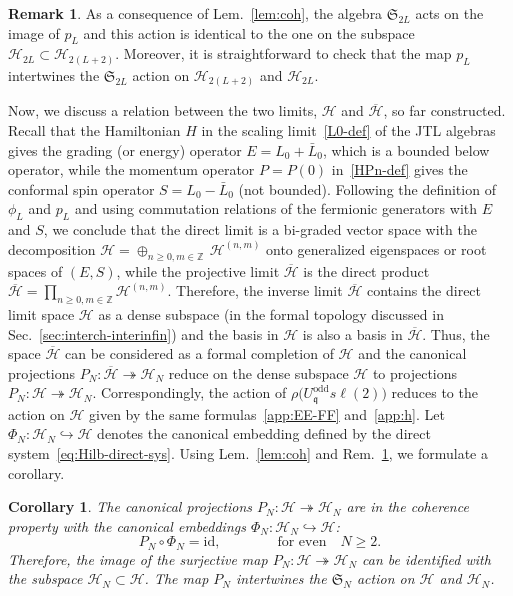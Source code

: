 \documentclass[11pt]{article}
\newcommand{\surj}{\twoheadrightarrow}
\newcommand{\inj}{\hookrightarrow}
\newcommand{\proj}{P}
\newcommand{\q}{\mathfrak{q}}
\newcommand{\LQGodd}{U^{\text{odd}}_{\q} s\ell(2)}
\newcommand{\Hilb}{\mathcal{H}}
\newcommand{\cHilb}{\overline{\Hilb}}
\newcommand{\oZ}{\mathbb{Z}}
\newcommand{\interLie}{\mathfrak{S}}
\newcommand{\interfin}[1]{\interLie_{#1}}
\newtheorem{Cor}[subsection]{Corollary}%
\theoremstyle{definition}
\newtheorem{rem}[subsubsection]{Remark}
\begin{document}
\begin{rem}\label{rem:coh}
As a consequence of Lem.~\ref{lem:coh}, the algebra $\interfin{2L}$ acts on the image of $p_L$ and this action is identical to the one on the subspace $\Hilb_{2L}\subset\Hilb_{2(L+2)}$.  Moreover, it is straightforward to check that the map $p_L$ intertwines the $\interfin{2L}$ action on  $\Hilb_{2(L+2)}$ and $\Hilb_{2L}$. %
\end{rem}

Now, we discuss a relation between the two limits, $\Hilb$ and $\cHilb$, so far constructed.
Recall that the Hamiltonian $H$ in the scaling limit~\eqref{L0-def} of the JTL algebras gives the grading (or energy) operator $E=L_0+\bar{L}_0$, which is a bounded below operator, while the momentum operator $P=P(0)$ in~\eqref{HPn-def} gives the conformal spin operator $S=L_0-\bar{L}_0$ (not bounded).
Following the definition of $\phi_L$ and $p_L$ and using commutation relations of the fermionic generators with $E$ and $S$, we conclude that the direct limit is a bi-graded vector space with the decomposition $\Hilb=\oplus_{n\geq0, m\in\oZ}\, \Hilb^{(n,m)}$ onto generalized eigenspaces or root spaces of $(E,S)$, while the projective limit $\cHilb$ is the direct product $\cHilb=\prod_{n\geq0, m\in\oZ} \Hilb^{(n,m)}$.
Therefore, the inverse limit $\cHilb$ contains the direct limit space $\Hilb$ as a dense subspace (in the formal topology discussed in Sec.~\ref{sec:interch-interinfin}) and the basis in $\Hilb$ is also a basis in $\cHilb$.
Thus, the space $\cHilb$ can be considered as a formal completion of $\Hilb$ and the canonical projections $\proj_N:\cHilb\twoheadrightarrow\Hilb_N$ reduce on the dense subspace $\Hilb$ to projections $\proj_N:\Hilb\twoheadrightarrow\Hilb_N$. Correspondingly, the action of $\rho\bigl(\LQGodd\bigr)$ reduces to the action on $\Hilb$ given by the same formulas~\eqref{app:EE-FF} and~\eqref{app:h}. Let $\Phi_N:\Hilb_{N}\inj\Hilb$ denotes the canonical embedding defined by the direct system~\eqref{eq:Hilb-direct-sys}. Using Lem.~\ref{lem:coh} and Rem.~\ref{rem:coh}, we formulate a corollary.
\begin{Cor}\label{cor:coh}
The canonical projections $\proj_N:\Hilb\surj\Hilb_N$ are in the coherence property with the canonical embeddings  $\Phi_N:\Hilb_{N}\inj\Hilb$:
\begin{equation}\label{eq:canon-coh}
\proj_N\circ\Phi_N = \mathrm{id},\qquad\qquad \text{for even}\quad N\geq2.
\end{equation}
Therefore, the image of the surjective map $\proj_N:\Hilb\surj\Hilb_N$ can be identified with the subspace $\Hilb_N\subset\Hilb$.
The map $\proj_N$ intertwines the $\interfin{N}$ action on  $\Hilb$ and $\Hilb_{N}$.
\end{Cor}
\end{document}
